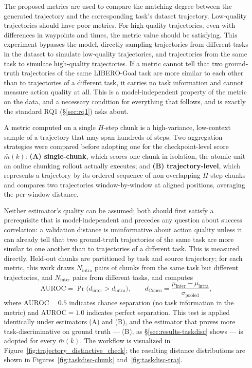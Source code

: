 \documentclass[english,12pt,a4paper,pdftex,elec,utf8]{aaltothesis}
\begin{document}
The proposed metrics are used to compare the matching degree between the generated trajectory and the corresponding task's dataset trajectory. Low-quality trajectories should have poor metrics. For high-quality trajectories, even with differences in waypoints and times, the metric value should be satisfying. This experiment bypasses the model, directly sampling trajectories from different tasks in the dataset to simulate low-quality trajectories, and trajectories from the same task to simulate high-quality trajectories. If a metric cannot tell that two ground-truth trajectories of the same LIBERO-Goal task are more similar to each other than to trajectories of a different task, it carries no task information and cannot measure action quality at all. This is a model-independent property of the metric on the data, and a necessary condition for everything that follows, and is exactly the standard RQ1 (\S\ref{sec:rq1}) asks about.

A metric computed on a single $H$-step chunk is a high-variance, low-context sample of a trajectory that may span hundreds of steps. Two aggregation strategies were compared before adopting one for the checkpoint-level score $\bar m(k)$: \textbf{(A) single-chunk}, which scores one chunk in isolation, the atomic unit an online chunking rollout actually executes; and \textbf{(B) trajectory-level}, which represents a trajectory by its ordered sequence of non-overlapping $H$-step chunks and compares two trajectories window-by-window at aligned positions, averaging the per-window distance.

Neither estimator's quality can be assumed; both should first satisfy a prerequisite that is model-independent and precedes any question about success correlation: a validation distance is uninformative about action quality unless it can already tell that two ground-truth trajectories of the same task are more similar to one another than to trajectories of a different task. This is measured directly. Held-out chunks are partitioned by task and source trajectory; for each metric, this work draws $N_{\mathrm{intra}}$ pairs of chunks from the same task but different trajectories, and $N_{\mathrm{inter}}$ pairs from different tasks, and computes
\begin{equation}
  \mathrm{AUROC} = \Pr\big(d_{\mathrm{inter}} > d_{\mathrm{intra}}\big),
  \qquad
  d_{\mathrm{Cohen}} = \frac{\mu_{\mathrm{inter}}-\mu_{\mathrm{intra}}}{\sigma_{\mathrm{pooled}}},
  \label{eq:taskdisc}
\end{equation}
where $\mathrm{AUROC}=0.5$ indicates chance separation (no task information in the metric) and $\mathrm{AUROC}=1.0$ indicates perfect separation. This test is applied identically under estimators (A) and (B), and the estimator that proves more task-discriminative on ground truth --- (B), as \S\ref{sec:results-taskdisc} shows --- is adopted for every $\bar m(k)$. The workflow is visualized in Figure~\ref{fig:trajectory_distinctive_check}; the resulting distance distributions are shown in Figures~\ref{fig:taskdisc-chunk} and~\ref{fig:taskdisc-traj}.
\end{document}
